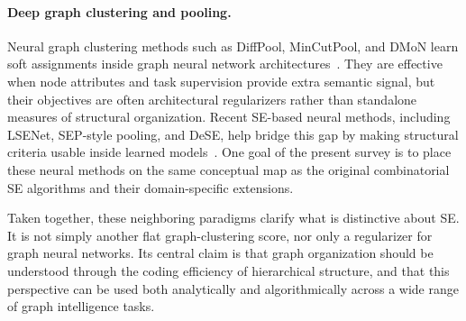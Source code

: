 \paragraph{Deep graph clustering and pooling.}
Neural graph clustering methods such as DiffPool, MinCutPool, and DMoN learn
soft assignments inside graph neural network architectures~\cite{ying2018diffpool,bianchi2020mincutpool,tsitsulin2020dmon}.
They are effective when node attributes and task supervision provide extra
semantic signal, but their objectives are often architectural regularizers
rather than standalone measures of structural organization.
Recent SE-based neural methods, including LSENet, SEP-style pooling, and
DeSE, help bridge this gap by making structural criteria usable inside learned
models~\cite{wu2022pooling,sun2024lsenet,zhang2025dese}.
One goal of the present survey is to place these neural methods on the same
conceptual map as the original combinatorial SE algorithms and their
domain-specific extensions.

Taken together, these neighboring paradigms clarify what is distinctive about
SE.
It is not simply another flat graph-clustering score, nor only a regularizer
for graph neural networks.
Its central claim is that graph organization should be understood through the
coding efficiency of hierarchical structure, and that this perspective can be
used both analytically and algorithmically across a wide range of graph
intelligence tasks.
